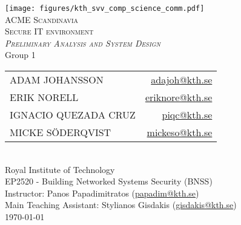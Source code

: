 \documentclass[a4paper,12pt,oneside]{article}
\begin{document}


\begin{titlepage}
    \begin{center}
        \texttt{[image: figures/kth\_svv\_comp\_science\_comm.pdf]}\\
        \vspace{2cm}
        \textsc{\LARGE ACME Scandinavia}\\
        \vspace{0.5cm}
        \textsc{\large Secure IT environment}\\
        \vspace{1cm}
        \textsc{\large\textit{Preliminary Analysis and System Design}}\\
        \vspace{5.5cm}
        Group 1\\
        \vspace{0.5cm}
        \begin{tabular}{ l  r }
            ADAM JOHANSSON          &   \small{\href{mailto:adajoh@kth.se}{adajoh@kth.se}}      \\
            ERIK NORELL             &   \small{\href{mailto:eriknore@kth.se}{eriknore@kth.se}}  \\
            IGNACIO QUEZADA CRUZ    &   \small{\href{mailto:piqc@kth.se}{piqc@kth.se}}          \\
            MICKE SÖDERQVIST        &   \small{\href{mailto:mickeso@kth.se}{mickeso@kth.se}}    \\
        \end{tabular}\\
        \vspace{1.5cm}
        Royal Institute of Technology\\
        EP2520 - Building Networked Systems Security (BNSS)\\
        Instructor: Panos Papadimitratos (\small{\href{mailto:papadim@kth.se}{papadim@kth.se}})\\
        Main Teaching Assistant: Stylianos Gisdakis (\small{\href{mailto:gisdakis@kth.se}{gisdakis@kth.se}})\\
        \vspace{0.5cm}
        \today\\
    \end{center}
\end{titlepage}

\clearpage
\pagebreak






%


\end{document}
